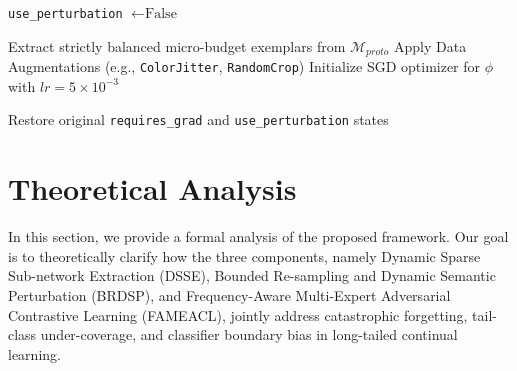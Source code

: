 \documentclass[journal]{IEEEtran}
\theoremstyle{plain}
\theoremstyle{definition}
\theoremstyle{remark}
\begin{document}
\begin{algorithm2e}[t]
\caption{Phase 2: Prototype-based Classifier Re-Training (cRT)}
\label{alg:crt}
\SetAlgoLined
{}

\texttt{use\_perturbation} $\leftarrow \text{False}$ 

Extract strictly balanced micro-budget exemplars from $\mathcal{M}_{proto}$\;
Apply Data Augmentations (e.g., \texttt{ColorJitter}, \texttt{RandomCrop})\;
Initialize SGD optimizer for $\phi$ with $lr=5 \times 10^{-3}$\;

Restore original \texttt{requires\_grad} and \texttt{use\_perturbation} states\;
\end{algorithm2e}

\section{Theoretical Analysis}\label{app:theoretical_analysis}

In this section, we provide a formal analysis of the proposed framework. Our goal is to theoretically clarify how the three components, namely Dynamic Sparse Sub-network Extraction (DSSE), Bounded Re-sampling and Dynamic Semantic Perturbation (BRDSP), and Frequency-Aware Multi-Expert Adversarial Contrastive Learning (FAMEACL), jointly address catastrophic forgetting, tail-class under-coverage, and classifier boundary bias in long-tailed continual learning.
\end{document}
